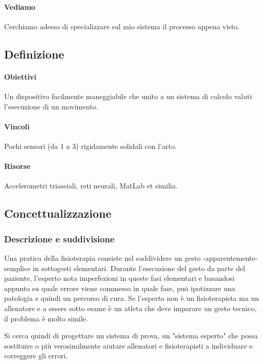 \paragraph{Vediamo}
Cerchiamo adesso di specializzare sul mio sistema il processo appena visto.

	\subsection{Definizione}

	\paragraph{Obiettivi}
	Un dispositivo facilmente maneggiabile
	che unito a un sistema di calcolo
	valuti l'esecuzione di un movimento.

	\paragraph{Vincoli}
	Pochi sensori (da 1 a 3) rigidamente solidali con l'arto.
	
	\paragraph{Risorse}
	Accelerometri triassiali, reti neurali, MatLab et similia.
	
	\subsection{Concettualizzazione}
	
	\subsubsection{Descrizione e suddivisione}
	Una pratica della fisioterapia consiste nel suddividere un gesto -apparentemente- semplice in sottogesti elementari.
	Durante l'esecuzione del gesto da parte del paziente,
	l'esperto nota imperfezioni in queste fasi elementari
	e basandosi appunto su quale errore viene commesso in quale fase,
	pu\`o ipotizzare una patologia e quindi un percorso di cura.
	Se l'esperto non \`e un fisioterapista ma un allenatore
	e a essere sotto esame \`e un atleta che deve imparare
	un gesto tecnico, il problema \`e molto simile.
	
	Si cerca quindi di progettare un sistema di prova,
	un "sistema esperto" che possa sostituire
	o pi\`u verosimilmente aiutare allenatori e fisioterapisti
	a individuare e correggere gli errori.
	
